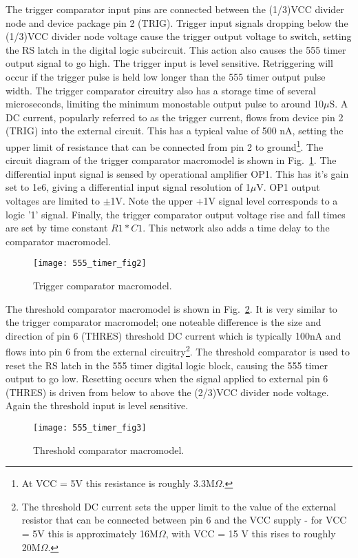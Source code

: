 The trigger comparator input pins are connected between the (1/3)VCC divider node and device package pin 2 (TRIG). Trigger input signals dropping below the (1/3)VCC divider node voltage cause the trigger output voltage to switch, setting the RS latch in the digital logic subcircuit.  This action also causes the 555 timer output signal to go high. The trigger input is level sensitive. Retriggering will occur if the trigger pulse is held low longer than the 555 timer output pulse width. The trigger comparator circuitry also has a storage time of several microseconds, limiting the minimum monostable output pulse to around 10$\mu$S. A DC current, popularly referred to as the trigger current, flows from device pin 2 (TRIG) into the external circuit. This has a typical value of 500 nA, setting the upper limit of resistance that can be connected from pin 2 to ground\footnote{At VCC = 5V this resistance is roughly 3.3M$\Omega$.}.  The circuit diagram of the trigger comparator macromodel is shown in Fig.~\ref{fig:555_timer_fig2}. The differential input signal is sensed by operational amplifier OP1. This has it's gain set to 1e6, giving a differential input signal resolution of 1$\mu$V. OP1 output voltages are limited to $\pm$1V. Note the upper +1V signal level corresponds to a logic '1' signal. Finally, the trigger comparator output voltage rise and fall times are set by time constant $R1*C1$. This network also adds a time delay to the comparator macromodel.
\FloatBarrier
\begin{figure}[ht]
  \centering
  \texttt{[image: 555\_timer\_fig2]}
  \caption{Trigger comparator macromodel.}
  \label{fig:555_timer_fig2} 
\end{figure} 
\FloatBarrier
\addvspace{12pt}

The threshold comparator macromodel is shown in Fig.~\ref{fig:555_timer_fig3}. It is very similar to the trigger comparator macromodel; one noteable difference is the size and direction of pin 6 (THRES) threshold DC current which is typically 100nA and flows into pin 6 from the external circuitry\footnote{The threshold DC current sets the upper limit to the value of the external resistor that can be connected between pin 6 and the VCC supply - for VCC = 5V this is approximately 16M$\Omega$, with VCC = 15 V this rises to roughly 20M$\Omega$.}. The threshold comparator is used to reset the RS latch in the 555 timer digital logic block, causing the 555 timer output to go low. Resetting occurs when the signal applied to external pin 6 (THRES) is driven from below to above the (2/3)VCC divider node voltage.  Again the threshold input is level sensitive.
\FloatBarrier
\begin{figure}[ht]
  \centering
  \texttt{[image: 555\_timer\_fig3]}
  \caption{Threshold comparator macromodel.}
  \label{fig:555_timer_fig3} 
\end{figure} 
\FloatBarrier

